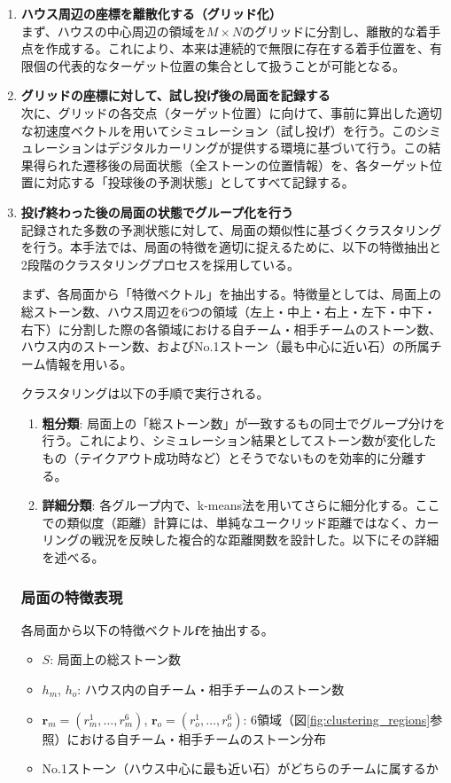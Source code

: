 \documentclass[11pt,a4j]{jreport}
\begin{document}
\begin{enumerate}
    \item \textbf{ハウス周辺の座標を離散化する（グリッド化）} \\
    まず、ハウスの中心周辺の領域を$M \times N$のグリッドに分割し、離散的な着手点を作成する。これにより、本来は連続的で無限に存在する着手位置を、有限個の代表的なターゲット位置の集合として扱うことが可能となる。

    \item \textbf{グリッドの座標に対して、試し投げ後の局面を記録する} \\
    次に、グリッドの各交点（ターゲット位置）に向けて、事前に算出した適切な初速度ベクトルを用いてシミュレーション（試し投げ）を行う。このシミュレーションはデジタルカーリングが提供する環境に基づいて行う。この結果得られた遷移後の局面状態（全ストーンの位置情報）を、各ターゲット位置に対応する「投球後の予測状態」としてすべて記録する。

    \item \textbf{投げ終わった後の局面の状態でグループ化を行う} \\
    記録された多数の予測状態に対して、局面の類似性に基づくクラスタリングを行う。本手法では、局面の特徴を適切に捉えるために、以下の特徴抽出と2段階のクラスタリングプロセスを採用している。

    まず、各局面から「特徴ベクトル」を抽出する。特徴量としては、局面上の総ストーン数、ハウス周辺を6つの領域（左上・中上・右上・左下・中下・右下）に分割した際の各領域における自チーム・相手チームのストーン数、ハウス内のストーン数、およびNo.1ストーン（最も中心に近い石）の所属チーム情報を用いる。

    クラスタリングは以下の手順で実行される。
    \begin{enumerate}
      \item \textbf{粗分類}: 局面上の「総ストーン数」が一致するもの同士でグループ分けを行う。これにより、シミュレーション結果としてストーン数が変化したもの（テイクアウト成功時など）とそうでないものを効率的に分離する。
      \item \textbf{詳細分類}: 各グループ内で、k-means法を用いてさらに細分化する。ここでの類似度（距離）計算には、単純なユークリッド距離ではなく、カーリングの戦況を反映した複合的な距離関数を設計した。以下にその詳細を述べる。
    \end{enumerate}

    \subsubsection{局面の特徴表現}
    各局面から以下の特徴ベクトル$\bm{f}$を抽出する。
    \begin{itemize}
        \item $S$: 局面上の総ストーン数
        \item $h_m$, $h_o$: ハウス内の自チーム・相手チームのストーン数
        \item $\bm{r}_m = (r_m^1, \ldots, r_m^6)$, $\bm{r}_o = (r_o^1, \ldots, r_o^6)$: 6領域（図\ref{fig:clustering_regions}参照）における自チーム・相手チームのストーン分布
        \item No.1ストーン（ハウス中心に最も近い石）がどちらのチームに属するか
    \end{itemize}


\end{enumerate}
\end{document}
